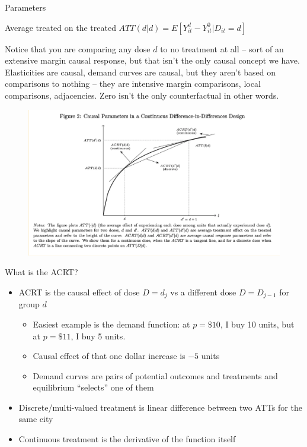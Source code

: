 \documentclass{beamer}
\begin{document}
\begin{frame}{Parameters}

\begin{block}{Average treated on the treated}
$ATT(d|d) = E[Y^d_{it} - Y^0_{it} | D_{it}=d]$
\end{block}

\bigskip

Notice that you are comparing any dose $d$ to no treatment at all -- sort of an extensive margin causal response, but that isn't the only causal concept we have.  Elasticities are causal, demand curves are causal, but they aren't based on comparisons to nothing -- they are intensive margin comparisons, local comparisons, adjacencies. Zero isn't the only counterfactual in other words.

\end{frame}
\begin{frame}


\begin{figure}
\begin{center}
             \includegraphics[scale=0.45]{./lecture_includes/continuous1.png}
\end{center}
\end{figure}

\end{frame}

\begin{frame}{What is the ACRT?}

\begin{itemize}
\item ACRT is the causal effect of dose $D=d_j$ vs a different dose $D=D_{j-1}$ for group $d$
	\begin{itemize}
	\item Easiest example is the demand function: at $p=\$10$, I buy 10 units, but at $p=\$11$, I buy 5 units.  
	\item Causal effect of that one dollar increase is $-5$ units
	\item Demand curves are pairs of potential outcomes and treatments and equilibrium ``selects'' one of them
	\end{itemize}
\item Discrete/multi-valued treatment is linear difference between two ATTs for the same city
\item Continuous treatment is the derivative of the function itself
\end{itemize}

\end{frame}
\end{document}
